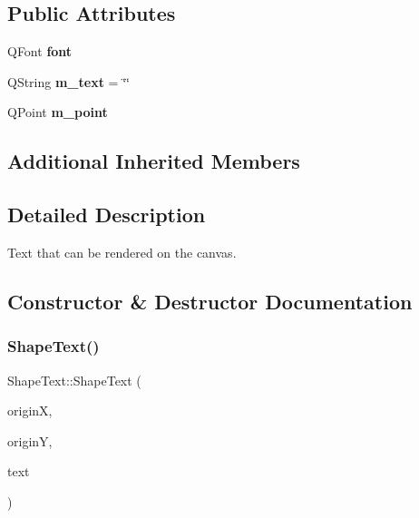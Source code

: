 \subsection*{Public Attributes}
\begin{DoxyCompactItemize}
\item 
\mbox{\label{class_shape_text_aed22454e8dd02ae1bb1a712afca1fd40}} 
Q\+Font {\bfseries font}
\item 
\mbox{\label{class_shape_text_aa4efe4cfbe6c64e96a0e8605797f0a06}} 
Q\+String {\bfseries m\+\_\+text} = \char`\"{}\char`\"{}
\item 
\mbox{\label{class_shape_text_a01dc23369f46389ead48f14baca5fb61}} 
Q\+Point {\bfseries m\+\_\+point}
\end{DoxyCompactItemize}
\subsection*{Additional Inherited Members}


\subsection{Detailed Description}
Text that can be rendered on the canvas. 

\subsection{Constructor \& Destructor Documentation}
\mbox{\label{class_shape_text_ab05926268592835c6b3dae338ac0066d}} 
\subsubsection{\texorpdfstring{ShapeText()}{ShapeText()}\hspace{0.1cm}{\footnotesize\ttfamily [1/2]}}
{\footnotesize\ttfamily Shape\+Text\+::\+Shape\+Text (\begin{DoxyParamCaption}\item[{int}]{originX,  }\item[{int}]{originY,  }\item[{const Q\+String \&}]{text }\end{DoxyParamCaption})}



